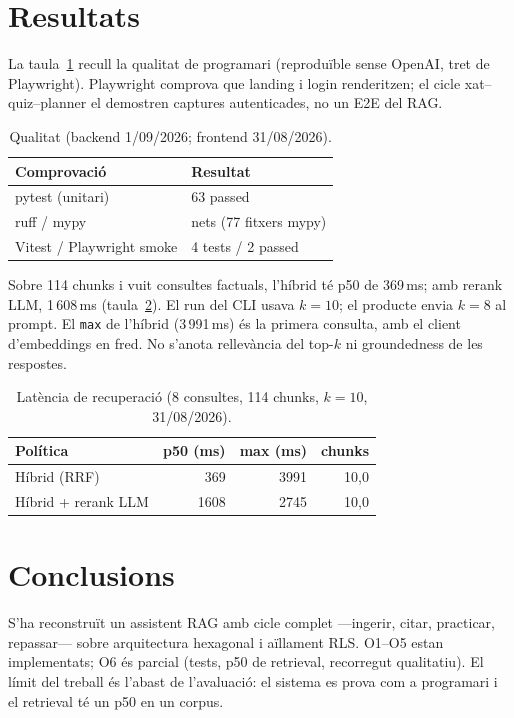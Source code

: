 \documentclass[10pt,a4paper,twoside]{article}
\begin{document}
\section{Resultats}
La taula~\ref{tab:qualitat} recull la qualitat de programari (reproduïble sense OpenAI, tret de Playwright).
Playwright comprova que landing i login renderitzen; el cicle xat--quiz--planner el demostren captures autenticades, no un E2E del RAG.

\begin{table}[H]
\centering
\caption{Qualitat (backend 1/09/2026; frontend 31/08/2026).}
\label{tab:qualitat}
{\scriptsize
\begin{tabular}{ll}
\toprule
Comprovació & Resultat \\
\midrule
pytest (unitari) & 63 passed \\
ruff / mypy & nets (77 fitxers mypy) \\
Vitest / Playwright smoke & 4 tests / 2 passed \\
\bottomrule
\end{tabular}}
\end{table}

Sobre 114 chunks i vuit consultes factuals, l'híbrid té p50 de 369\,ms; amb rerank LLM, 1\,608\,ms (taula~\ref{tab:latencia}).
El run del CLI usava $k=10$; el producte envia $k=8$ al prompt.
El \texttt{max} de l'híbrid (3\,991\,ms) és la primera consulta, amb el client d'embeddings en fred.
No s'anota rellevància del top-$k$ ni groundedness de les respostes.

\begin{table}[H]
\centering
\caption{Latència de recuperació (8 consultes, 114 chunks, $k=10$, 31/08/2026).}
\label{tab:latencia}
{\scriptsize
\begin{tabular}{lrrr}
\toprule
Política & p50 (ms) & max (ms) & chunks \\
\midrule
Híbrid (RRF) & 369 & 3991 & 10,0 \\
Híbrid + rerank LLM & 1608 & 2745 & 10,0 \\
\bottomrule
\end{tabular}}
\end{table}

\section{Conclusions}
S'ha reconstruït un assistent RAG amb cicle complet ---ingerir, citar, practicar, repassar--- sobre arquitectura hexagonal i aïllament RLS.
O1--O5 estan implementats; O6 és parcial (tests, p50 de retrieval, recorregut qualitatiu).
El límit del treball és l'abast de l'avaluació: el sistema es prova com a programari i el retrieval té un p50 en un corpus.
\end{document}
